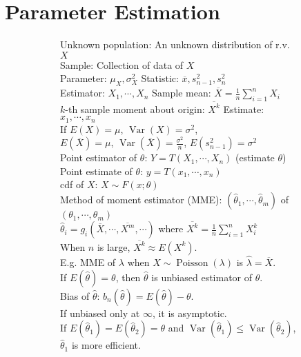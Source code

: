 \documentclass{article}
\DeclareMathOperator{\Var}{Var}
\DeclareMathOperator{\Poisson}{Poisson}
\begin{document}
\section{Parameter Estimation}
\begin{figure}[h!]
    \begin{subfigure}[h!]{0.5\textwidth}
        Unknown population: An unknown distribution of r.v. $X$\\
        Sample: Collection of data of $X$\\
        Parameter: $\mu_{X},\sigma_{X}^{2}$ \quad Statistic: $\overline{x},s_{n-1}^{2},s_{n}^{2}$\\
        Estimator: $X_{1},\cdots,X_{n}$ \quad Sample mean: $\overline{X}=\frac{1}{n}\sum_{i=1}^{n}X_{i}$\\
        $k$-th sample moment about origin: $\overline{X^{k}}$ \quad Estimate: $x_{1},\cdots,x_{n}$\\
        If $E(X)=\mu$, $\Var(X)=\sigma^{2}$,\\
        $E(\overline{X})=\mu$, $\Var(\overline{X})=\frac{\sigma^{2}}{n}$, $E(s_{n-1}^{2})=\sigma^{2}$\\
        Point estimator of $\theta$: $Y=T(X_{1},\cdots,X_{n})$ (estimate $\theta$)\\
        Point estimate of $\theta$: $y=T(x_{1},\cdots,x_{n})$\\
        cdf of $X$: $X\sim F(x;\theta)$\\
        Method of moment estimator (MME): $(\hat{\theta}_{1},\cdots,\hat{\theta}_{m})$ of $(\theta_{1},\cdots,\theta_{m})$\\
        $\hat{\theta}_{i}=g_{i}(\overline{X},\cdots,\overline{X^{m}},\cdots)$ where $\overline{X^{k}}=\frac{1}{n}\sum_{i=1}^{n}X_{i}^{k}$\\
        When $n$ is large, $\overline{X^{k}}\approx E(X^{k})$.\\
        E.g. MME of $\lambda$ when $X\sim\Poisson(\lambda)$ is $\hat{\lambda}=\overline{X}$.\\
        If $E(\hat{\theta})=\theta$, then $\hat{\theta}$ is unbiased estimator of $\theta$.\\
        Bias of $\hat{\theta}$: $b_{n}(\hat{\theta})=E(\hat{\theta})-\theta$.\\
        If unbiased only at $\infty$, it is asymptotic.\\
        If $E(\hat{\theta}_{1})=E(\hat{\theta}_{2})=\theta$ and $\Var(\hat{\theta}_{1})\leq\Var(\hat{\theta}_{2})$, $\hat{\theta}_{1}$ is more efficient.
    \end{subfigure}

\end{figure}
\end{document}
